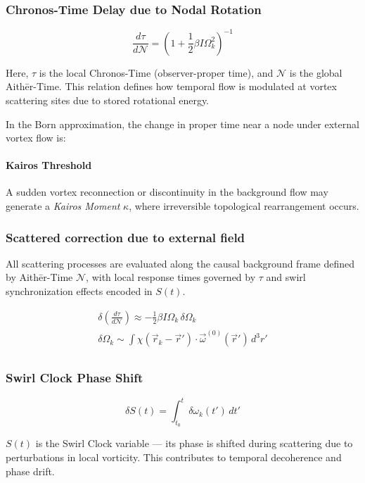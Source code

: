 \documentclass[preprint]{revtex4-2}
\begin{document}
\subsubsection*{Chronos-Time Delay due to Nodal Rotation}

\[
    \frac{d\tau}{d\mathcal{N}} = \left(1 + \frac{1}{2} \beta I \Omega_k^2 \right)^{-1}
\]

Here, \( \tau \) is the local Chronos-Time (observer-proper time), and $\mathcal{N}$ is the global Aithēr-Time. This relation defines how temporal flow is modulated at vortex scattering sites due to stored rotational energy.


In the Born approximation, the change in proper time near a node under external vortex flow is:
\paragraph{Kairos Threshold} A sudden vortex reconnection or discontinuity in the background flow may generate a \emph{Kairos Moment} \( \kappa \), where irreversible topological rearrangement occurs.

\subsubsection*{Scattered correction due to external field}
All scattering processes are evaluated along the causal background frame defined by Aithēr-Time \( \mathcal{N} \), with local response times governed by \( \tau \) and swirl synchronization effects encoded in \( S(t) \).

\begin{gather*}
    \delta \left( \frac{d\tau}{d\mathcal{N}} \right)\approx - \frac{1}{2} \beta I \Omega_k \, \delta \Omega_k\\
    \delta \Omega_k \sim \int \chi(\vec{r}_k - \vec{r}') \cdot \vec{\omega}^{(0)}(\vec{r}') \, d^3r'\\
\end{gather*}

\subsubsection*{Swirl Clock Phase Shift}
\[
    \delta S(t) = \int_{t_0}^{t} \delta \omega_k(t') \, dt'
\]

$S(t)$ is the Swirl Clock variable — its phase is shifted during scattering due to perturbations in local vorticity. This contributes to temporal decoherence and phase drift.
\end{document}
